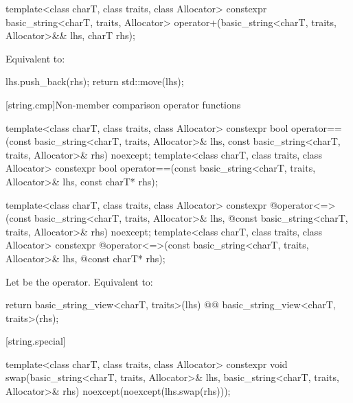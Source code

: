 %
\begin{itemdecl}
template<class charT, class traits, class Allocator>
  constexpr basic_string<charT, traits, Allocator>
    operator+(basic_string<charT, traits, Allocator>&& lhs, charT rhs);
\end{itemdecl}

\begin{itemdescr}
\pnum
\effects
Equivalent to:
\begin{codeblock}
lhs.push_back(rhs);
return std::move(lhs);
\end{codeblock}
\end{itemdescr}

[string.cmp]{Non-member comparison operator functions}
\begin{itemdecl}
template<class charT, class traits, class Allocator>
  constexpr bool
    operator==(const basic_string<charT, traits, Allocator>& lhs,
               const basic_string<charT, traits, Allocator>& rhs) noexcept;
template<class charT, class traits, class Allocator>
  constexpr bool operator==(const basic_string<charT, traits, Allocator>& lhs,
                            const charT* rhs);

template<class charT, class traits, class Allocator>
  constexpr @\seebelow@ operator<=>(const basic_string<charT, traits, Allocator>& lhs,
            @\itcorr@                      const basic_string<charT, traits, Allocator>& rhs) noexcept;
template<class charT, class traits, class Allocator>
  constexpr @\seebelow@ operator<=>(const basic_string<charT, traits, Allocator>& lhs,
            @\itcorr@                      const charT* rhs);
\end{itemdecl}
\begin{itemdescr}
\pnum
\effects
Let  be the operator.
Equivalent to:
\begin{codeblock}
return basic_string_view<charT, traits>(lhs) @@ basic_string_view<charT, traits>(rhs);
\end{codeblock}
\end{itemdescr}

[string.special]{}

\begin{itemdecl}
template<class charT, class traits, class Allocator>
  constexpr void
    swap(basic_string<charT, traits, Allocator>& lhs,
         basic_string<charT, traits, Allocator>& rhs)
      noexcept(noexcept(lhs.swap(rhs)));
\end{itemdecl}

